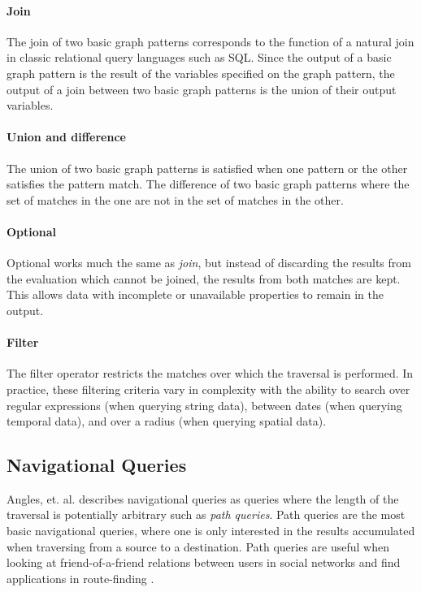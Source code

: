 \paragraph{Join} The join of two basic graph patterns corresponds to the function of a natural join in classic relational query languages such as SQL. Since the output of a basic graph pattern is the result of the variables specified on the graph pattern, the output of a join between two basic graph patterns is the union of their output variables.

\paragraph{Union and difference} The union of two basic graph patterns is satisfied when one pattern or the other satisfies the pattern match. The difference of two basic graph patterns where the set of matches in the one are not in the set of matches in the other.

\paragraph{Optional} Optional works much the same as \emph{join}, but instead of discarding the results from the evaluation which cannot be joined, the results from both matches are kept. This allows data with incomplete or unavailable properties to remain in the output.

\paragraph{Filter} The filter operator restricts the matches over which the traversal is performed. In practice, these filtering criteria vary in complexity with the ability to search over regular expressions (when querying string data), between dates (when querying temporal data), and over a radius (when querying spatial data).

\subsection{Navigational Queries}

Angles, et. al. \cite{foundations-of-modern-gql} describes navigational queries as queries where the length of the traversal is potentially arbitrary such as \emph{path queries}. Path queries are the most basic navigational queries, where one is only interested in the results accumulated when traversing from a source to a destination. Path queries are useful when looking at friend-of-a-friend relations between users in social networks and find applications in route-finding \cite{route-finding}.

